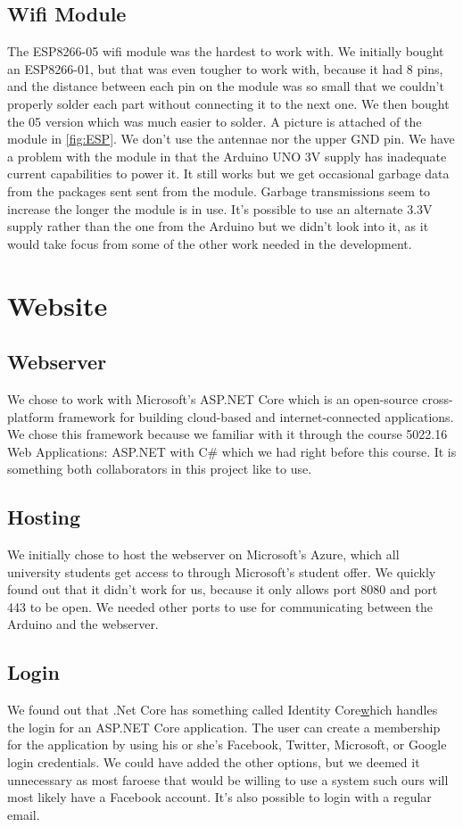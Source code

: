 \documentclass[a4paper,12pt,twoside,openright,titlepage]{book}
\begin{document}
\section{Wifi Module}
The ESP8266-05 wifi module was the hardest to work with. We initially bought an ESP8266-01, but that was even tougher to work with, because it had 8 pins, and the distance between each pin on the module was so small that we couldn't properly solder each part without connecting it to the next one. We then bought the 05 version which was much easier to solder. A picture is attached of the module in \ref{fig:ESP}. We don't use the antennae nor the upper GND pin. We have a problem with the module in that the Arduino UNO 3V supply has inadequate current capabilities to power it. It still works but we get occasional garbage data from the packages sent sent from the module. Garbage transmissions seem to increase the longer the module is in use. It's possible to use an alternate 3.3V supply rather than the one from the Arduino but we didn't look into it, as it would take focus from some of the other work needed in the development.

\chapter{Website}
\section*{Webserver}
We chose to work with Microsoft's ASP.NET Core which is an open-source cross-platform framework for building cloud-based and internet-connected applications. We chose this framework because we familiar with it through the course 5022.16 Web Applications: ASP.NET with C\# which we had right before this course. It is something both collaborators in this project like to use. 


\section{Hosting}
We initially chose to host the webserver on Microsoft's Azure, which all university students get access to through Microsoft's student offer. We quickly found out that it didn't work for us, because it only allows port 8080 and port 443 to be open. We needed other ports to use for communicating between the Arduino and the webserver.

\section{Login}
We found out that .Net Core has something called Identity Core\href{https://docs.microsoft.com/en-us/aspnet/core/security/authentication/identity?view=aspnetcore-2.2&tabs=visual-studio} which handles the login for an ASP.NET Core application. The user can create a membership for the application by using his or she's  Facebook, Twitter, Microsoft, or Google login credentials. We could have added the other options, but we deemed it unnecessary as most faroese that would be willing to use a system such ours will most likely have a Facebook account. It's also possible to login with a regular email.
\end{document}
